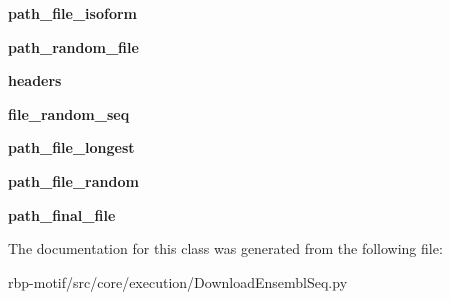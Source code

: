 \begin{DoxyCompactItemize}
\item 
\hypertarget{classsrc_1_1core_1_1execution_1_1DownloadEnsemblSeq_1_1DownloadEnsemblSeq_a0c9c81ff7b07fb37a6e024e665f7fe3f}{{\bfseries path\-\_\-file\-\_\-isoform}}\label{classsrc_1_1core_1_1execution_1_1DownloadEnsemblSeq_1_1DownloadEnsemblSeq_a0c9c81ff7b07fb37a6e024e665f7fe3f}

\item 
\hypertarget{classsrc_1_1core_1_1execution_1_1DownloadEnsemblSeq_1_1DownloadEnsemblSeq_a3a1c18bae588ca40ec3ce39bc8ba0660}{{\bfseries path\-\_\-random\-\_\-file}}\label{classsrc_1_1core_1_1execution_1_1DownloadEnsemblSeq_1_1DownloadEnsemblSeq_a3a1c18bae588ca40ec3ce39bc8ba0660}

\item 
\hypertarget{classsrc_1_1core_1_1execution_1_1DownloadEnsemblSeq_1_1DownloadEnsemblSeq_a468e458dbf8768adc312aa1df1c1772a}{{\bfseries headers}}\label{classsrc_1_1core_1_1execution_1_1DownloadEnsemblSeq_1_1DownloadEnsemblSeq_a468e458dbf8768adc312aa1df1c1772a}

\item 
\hypertarget{classsrc_1_1core_1_1execution_1_1DownloadEnsemblSeq_1_1DownloadEnsemblSeq_aea2b1e940fc578b076ca6eb389ce9c12}{{\bfseries file\-\_\-random\-\_\-seq}}\label{classsrc_1_1core_1_1execution_1_1DownloadEnsemblSeq_1_1DownloadEnsemblSeq_aea2b1e940fc578b076ca6eb389ce9c12}

\item 
\hypertarget{classsrc_1_1core_1_1execution_1_1DownloadEnsemblSeq_1_1DownloadEnsemblSeq_ae955d787d481828055f75234dda24e97}{{\bfseries path\-\_\-file\-\_\-longest}}\label{classsrc_1_1core_1_1execution_1_1DownloadEnsemblSeq_1_1DownloadEnsemblSeq_ae955d787d481828055f75234dda24e97}

\item 
\hypertarget{classsrc_1_1core_1_1execution_1_1DownloadEnsemblSeq_1_1DownloadEnsemblSeq_a1f7b64e66476a4883472ddebf0c5ebe3}{{\bfseries path\-\_\-file\-\_\-random}}\label{classsrc_1_1core_1_1execution_1_1DownloadEnsemblSeq_1_1DownloadEnsemblSeq_a1f7b64e66476a4883472ddebf0c5ebe3}

\item 
\hypertarget{classsrc_1_1core_1_1execution_1_1DownloadEnsemblSeq_1_1DownloadEnsemblSeq_a5f136d0810af57ff6f0f052226faa427}{{\bfseries path\-\_\-final\-\_\-file}}\label{classsrc_1_1core_1_1execution_1_1DownloadEnsemblSeq_1_1DownloadEnsemblSeq_a5f136d0810af57ff6f0f052226faa427}

\end{DoxyCompactItemize}


The documentation for this class was generated from the following file\-:\begin{DoxyCompactItemize}
\item 
rbp-\/motif/src/core/execution/Download\-Ensembl\-Seq.\-py\end{DoxyCompactItemize}
